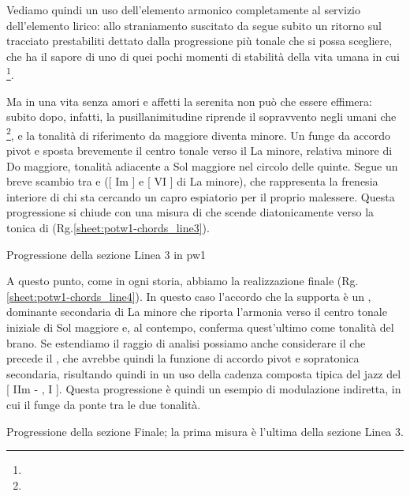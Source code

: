 \documentclass[class=book, crop=false, oneside, 12pt]{standalone}
\begin{document}
    Vediamo quindi un uso dell'elemento armonico completamente al servizio dell'elemento lirico: allo straniamento suscitato da  segue subito un ritorno sul tracciato prestabiliti dettato dalla progressione più tonale che si possa scegliere, che ha il sapore di uno di quei pochi momenti di stabilità della vita umana in cui  \footnote{}.

    Ma in una vita senza amori e affetti la serenita non può che essere effimera: subito dopo, infatti, la pusillanimitudine riprende il sopravvento negli umani che \footnote{}, e la tonalità di riferimento da maggiore diventa minore. Un  funge da accordo pivot e sposta brevemente il centro tonale verso il La minore, relativa minore di Do maggiore, tonalità adiacente a Sol maggiore nel circolo delle quinte. Segue un breve scambio tra  e  ([ Im ] e [ \flat VI ] di La minore), che rappresenta la frenesia interiore di chi sta cercando un capro espiatorio per il proprio malessere. Questa progressione si chiude con una misura di  che scende diatonicamente verso la tonica di  (Rg.\ref{sheet:potw1-chords_line3}).

    \begin{sheet}{Progressione della sezione Linea 3 in \acrshort{pw1}}
        \label{sheet:potw1-chords_line3}
    \end{sheet}

    A questo punto, come in ogni storia, abbiamo la realizzazione finale (Rg.\ref{sheet:potw1-chords_line4}). In questo caso l'accordo che la supporta è un , dominante secondaria di La minore che riporta l'armonia verso il centro tonale iniziale di Sol maggiore e, al contempo, conferma quest'ultimo come tonalità del brano. Se estendiamo il raggio di analisi possiamo anche considerare il  che precede il , che avrebbe quindi la funzione di accordo pivot e sopratonica secondaria, risultando quindi in un uso della cadenza composta tipica del jazz del [ IIm - , I ]. Questa progressione è quindi un esempio di modulazione indiretta, in cui il  funge da ponte tra le due tonalità.

    \begin{sheet}{Progressione della sezione Finale; la prima misura è l'ultima della sezione Linea 3.}
        \label{sheet:potw1-chords_line4}
    \end{sheet}
\end{document}

